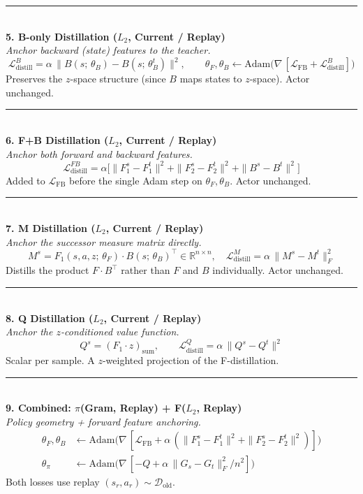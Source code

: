 \documentclass[10pt]{article}
\newcommand{\loss}{\mathcal{L}}
\newcommand{\R}{\mathbb{R}}
\newcommand{\Dold}{\mathcal{D}_{\text{old}}}
\newcommand{\method}[2]{%
  \noindent\rule{\textwidth}{0.5pt}\\[2pt]
  {\large\textbf{#1}}\\[2pt]
  \textit{#2}\\[4pt]
}
\begin{document}
\method{5. B-only Distillation ($L_2$, Current / Replay)}{Anchor backward (state) features to the teacher.}
\vspace{-0.5em}
\[
\loss_{\text{distill}}^{B} = \alpha\,\|B(s;\,\theta_B) - B(s;\,\theta_B^t)\|^2, \qquad
\theta_F, \theta_B \leftarrow \mathrm{Adam}\bigl(\nabla\,[\loss_{\text{FB}} + \loss_{\text{distill}}^{B}]\bigr)
\]
Preserves the $z$-space structure (since $B$ maps states to $z$-space). Actor unchanged.

\method{6. F+B Distillation ($L_2$, Current / Replay)}{Anchor both forward and backward features.}
\vspace{-0.5em}
\[
\loss_{\text{distill}}^{FB} = \alpha\bigl[\|F_1^s - F_1^t\|^2 + \|F_2^s - F_2^t\|^2 + \|B^s - B^t\|^2\bigr]
\]
Added to $\loss_{\text{FB}}$ before the single Adam step on $\theta_F, \theta_B$. Actor unchanged.

\method{7. M Distillation ($L_2$, Current / Replay)}{Anchor the successor measure matrix directly.}
\vspace{-0.5em}
\[
M^s = F_1(s,a,z;\,\theta_F) \cdot B(s;\,\theta_B)^\top \in \R^{n \times n}, \quad
\loss_{\text{distill}}^{M} = \alpha\,\|M^s - M^t\|_F^2
\]
Distills the product $F \cdot B^\top$ rather than $F$ and $B$ individually. Actor unchanged.

\method{8. Q Distillation ($L_2$, Current / Replay)}{Anchor the $z$-conditioned value function.}
\vspace{-0.5em}
\[
Q^s = (F_1 \cdot z)_{\text{sum}}, \qquad
\loss_{\text{distill}}^{Q} = \alpha\,\|Q^s - Q^t\|^2
\]
Scalar per sample. A $z$-weighted projection of the F-distillation.

\method{9. Combined: $\pi$(Gram, Replay) + F($L_2$, Replay)}{Policy geometry + forward feature anchoring.}
\vspace{-0.5em}
\begin{align*}
\theta_F, \theta_B &\leftarrow \mathrm{Adam}\bigl(\nabla\,[\loss_{\text{FB}} + \alpha\,(\|F_1^s - F_1^t\|^2 + \|F_2^s - F_2^t\|^2)]\bigr)\\
\theta_\pi &\leftarrow \mathrm{Adam}\bigl(\nabla\,[-Q + \alpha\,\|G_s - G_t\|_F^2/n^2]\bigr)
\end{align*}
Both losses use replay $(s_r, a_r) \sim \Dold$.
\end{document}
